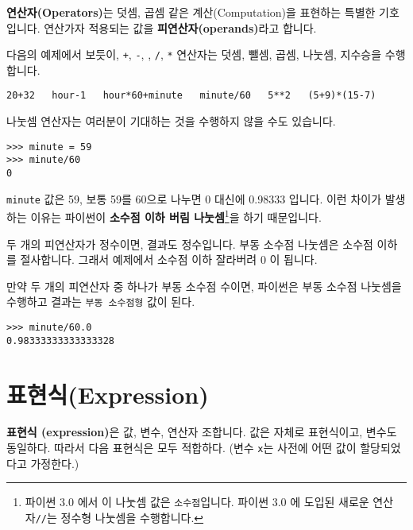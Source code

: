 
{\bf 연산자(Operators)}는 덧셈, 곱셈 같은 계산(Computation)을 표현하는 특별한 기호입니다. 연산가자 적용되는 값을 {\bf 피연산자(operands)}라고 합니다.

다음의 예제에서 보듯이, {\tt +}, {\tt -}, {\tt *}, {\tt /}, {\tt **} 연산자는 덧셈, 뺄셈, 곱셈, 나눗셈, 지수승을 수행합니다.

\beforeverb
\begin{verbatim}
20+32   hour-1   hour*60+minute   minute/60   5**2   (5+9)*(15-7)
\end{verbatim}
\afterverb
%
나눗셈 연산자는 여러분이 기대하는 것을 수행하지 않을 수도 있습니다.

\beforeverb
\begin{verbatim}
>>> minute = 59
>>> minute/60
0
\end{verbatim}
\afterverb
%

{\tt minute} 값은 59, 보통 59를 60으로 나누면 0 대신에 0.98333 입니다. 이런 차이가 발생하는 이유는 파이썬이 {\bf 소수점 이하 버림 나눗셈}\footnote{파이썬 3.0 에서 이 나눗셈 값은 {\tt 소수점}입니다. 파이썬 3.0 에 도입된 새로운 연산자{\tt //}는 정수형 나눗셈을 수행합니다.}을 하기 때문입니다.


두 개의 피연산자가 정수이면, 결과도 정수입니다. 부동 소수점 나눗셈은 소수점 이하를 절사합니다.
그래서 예제에서 소수점 이하 잘라버려 0 이 됩니다.

만약 두 개의 피연산자 중 하나가 부동 소수점 수이면, 파이썬은 부동 소수점 나눗셈을 수행하고 결과는 {\tt 부동 소수점형} 값이 된다.

\beforeverb
\begin{verbatim}
>>> minute/60.0
0.98333333333333328
\end{verbatim}
\afterverb

\section{표현식(Expression)}

{\bf 표현식 (expression)}은 값, 변수, 연산자 조합니다. 값은 자체로 표현식이고, 변수도 동일하다. 따라서 다음 표현식은 모두 적합하다. 
(변수 {\tt x}는 사전에 어떤 값이 할당되었다고 가정한다.)

